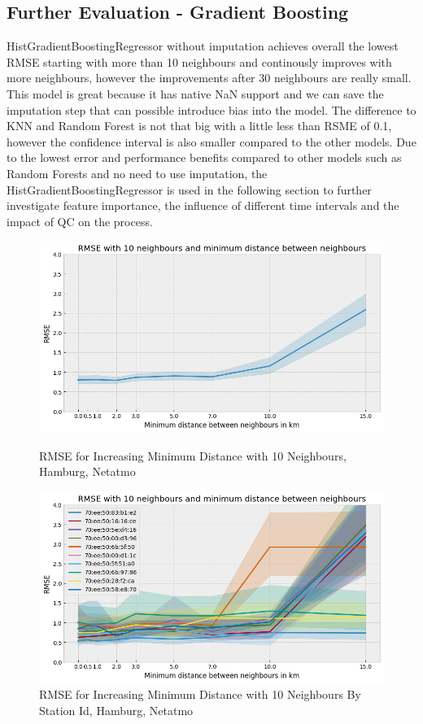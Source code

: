 \subsection{Further Evaluation - Gradient Boosting}

HistGradientBoostingRegressor without imputation achieves overall the lowest RMSE starting with more than 10 neighbours and continously improves with more neighbours, however the improvements after 30 neighbours are really small. This model is great because it has native NaN support and we can save the imputation step that can possible introduce bias into the model. The difference to KNN and Random Forest is not that big with a little less than RSME of 0.1, however the confidence interval is also smaller compared to the other models. Due to the lowest error and performance benefits compared to other models such as Random Forests and no need to use imputation, the HistGradientBoostingRegressor is used in the following section to further investigate feature importance, the influence of different time intervals and the impact of QC on the process.\\

\begin{figure}[htp]
    \centering
    \includegraphics[width=1\textwidth]{images/rmse_10_neighbours_min_distance.png}
    \caption{RMSE for Increasing Minimum Distance with 10 Neighbours, Hamburg, Netatmo}
    \label{fig:eval hamburg minimum distance between stations}

    \centering
    \includegraphics[width=1\textwidth]{images/rmse_10_neighbours_min_distance_by_pid.png}
    \caption{RMSE for Increasing Minimum Distance with 10 Neighbours By Station Id, Hamburg, Netatmo}
    \label{fig:eval hamburg minimum distance between stations by station id}
\end{figure}

